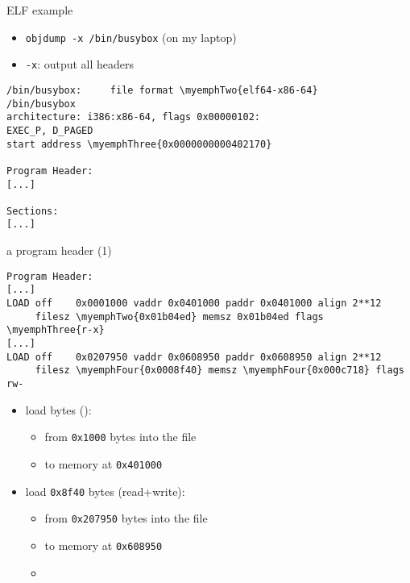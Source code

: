\providecommand{\myemphTwo}[1]{\myemph<2>{#1}}
\providecommand{\myemphTwoB}[1]{\myemph<2>{\textbf<2>{#1}}}
\providecommand{\myemphThree}[1]{\myemph<3>{#1}}
\providecommand{\myemphFour}[1]{\myemph<4>{#1}}
\providecommand{\myemphFive}[1]{\myemph<5>{#1}}
\providecommand{\myemphSix}[1]{\myemph<6>{#1}}
\providecommand{\myemphSeven}[1]{\myemph<7>{#1}}

\begin{frame}[fragile,label=elfExOver1]{ELF example}
    \begin{itemize}
    \item {\tt objdump -x /bin/busybox} (on my laptop)
    \item {\tt -x}: output all headers
    \end{itemize}
\begin{Verbatim}[commandchars=\\\{\},fontsize=\small]
/bin/busybox:     file format \myemphTwo{elf64-x86-64}
/bin/busybox
architecture: i386:x86-64, flags 0x00000102:
EXEC_P, D_PAGED
start address \myemphThree{0x0000000000402170}

Program Header:
[...]

Sections:
[...]
\end{Verbatim}
\end{frame}

\begin{frame}[fragile,label=elfExOver2]{a program header (1)}
\begin{Verbatim}[commandchars=\\\{\},fontsize=\fontsize{9}{10}\selectfont]
Program Header:
[...]
LOAD off    0x0001000 vaddr 0x0401000 paddr 0x0401000 align 2**12
     filesz \myemphTwo{0x01b04ed} memsz 0x01b04ed flags \myemphThree{r-x}
[...]
LOAD off    0x0207950 vaddr 0x0608950 paddr 0x0608950 align 2**12
     filesz \myemphFour{0x0008f40} memsz \myemphFour{0x000c718} flags rw-

\end{Verbatim}
\begin{itemize}
\item load {\tt {}} bytes ():
        \begin{itemize}
        \item from {\tt 0x1000} bytes into the file 
        \item to memory at {\tt 0x401000} \\
        \end{itemize}
\item load {\tt 0x8f40} bytes (read+write):
        \begin{itemize}
        \item from {\tt 0x207950} bytes into the file 
        \item to memory at {\tt 0x608950} 
        \item {}
        \end{itemize}
\end{itemize}
\end{frame}

